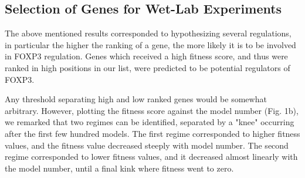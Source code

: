 \documentclass[oneside, 10pt, a4paper, twocolumn]{article}
\begin{document}
{%


\subsection{Selection of Genes for Wet-Lab Experiments}    
\label{SubSection:FinalSelection}

The above mentioned results corresponded to hypothesizing several regulations, in particular the higher the ranking of a gene, the more likely it is to be involved in FOXP3 regulation. 
Genes which received a high fitness score, and thus were ranked in high positions in our list, were predicted to be potential regulators of FOXP3. 

Any threshold separating high and low ranked genes would be somewhat arbitrary. However, plotting the fitness score against the model number (Fig. 1b), we remarked that two regimes can be identified, separated by a "knee" occurring after the first few hundred models. The first regime corresponded to higher fitness values, and the fitness value decreased steeply with model number. The second regime corresponded to lower fitness values, and it decreased almost linearly with the model number, until a final kink where fitness went to zero.

}
\end{document}

